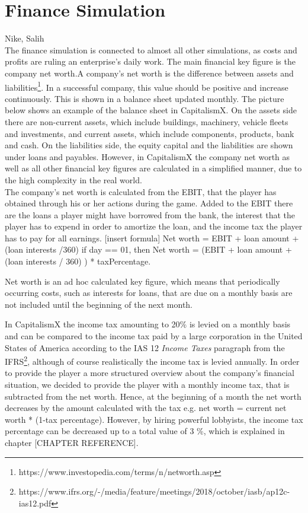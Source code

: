 \section{Finance Simulation}
\label{sec:diag}
Nike, Salih\\
The finance simulation is connected to almost all other simulations, as costs and profits are ruling an enterprise's daily work. The main financial key figure is the company net worth.A company's net worth is the difference between assets and liabilities\footnote{https://www.investopedia.com/terms/n/networth.asp}. In a successful company, this value should be positive and increase continuously. This is shown in a balance sheet updated monthly. The picture below shows an example of the balance sheet in CapitalismX. On the assets side there are non-current assets, which include buildings, machinery, vehicle fleets and investments, and current assets, which include components, products, bank and cash. On the liabilities side, the equity capital and the liabilities are shown under loans and payables. However, in CapitalismX the company net worth as well as all other financial key figures are calculated in a simplified manner, due to the high complexity in the real world.\\

The company’s net worth is calculated from the EBIT, that the player has obtained through his or her actions during the game. Added to the EBIT there are the loans a player might have borrowed from the bank, the interest that the player has to expend in order to amortize the loan, and the income tax the player has to pay for all earnings. [insert formula]
Net worth = EBIT + loan amount + (loan interests /360) if day == 01, then Net worth = (EBIT + loan amount + (loan interests / 360) ) * taxPercentage.

Net worth is an ad hoc calculated key figure, which means that periodically occurring costs, such as interests for loans, that are due on a monthly basis are not included until the beginning of the next month. 

In CapitalismX the income tax amounting to 20\% is levied on a monthly basis and can be compared to the income tax paid by a large corporation in the United States of America according to the IAS 12 \textit{Income Taxes} paragraph from the IFRS\footnote{https://www.ifrs.org/-/media/feature/meetings/2018/october/iasb/ap12c-ias12.pdf}, although of course realistically the income tax is levied annually. In order to provide the player a more structured overview about the company’s financial situation, we decided to provide the player with a monthly income tax, that is subtracted from the net worth. Hence, at the beginning of a month the net worth decreases by the amount calculated with the tax e.g. net worth = current net worth * (1-tax percentage). However, by hiring powerful lobbyists, the income tax percentage can be decreased up to a total value of 3 \%, which is explained in chapter [CHAPTER REFERENCE].\\

